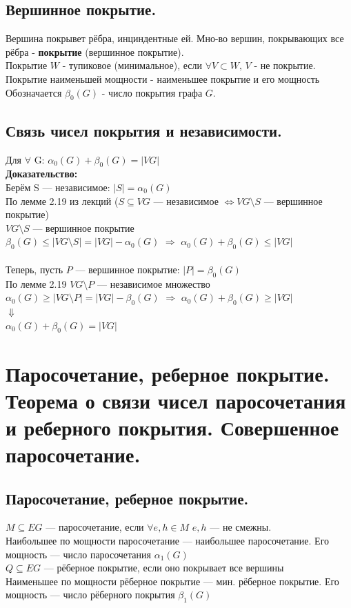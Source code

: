 \documentclass[12pt]{article}
\begin{document}
\subsection{Вершинное покрытие.}
	Вершина покрывет рёбра, инциндентные ей. Мно-во вершин, покрывающих все рёбра - \textbf{покрытие} (вершинное покрытие).\\
	Покрытие $W$ - тупиковое (минимальное), если $\forall V \subset W, \, V$ - не покрытие. Покрытие наименьшей мощности - наименьшее покрытие и его мощность
	Обозначается $\beta_0(G)$ - число покрытия графа $G$.
\subsection{Связь чисел покрытия и независимости.}
	Для $\forall$ G: $\alpha_0(G)+\beta_0(G)=|VG|$\\
\textbf{Доказательство:}\\
	Берём S — независимое: $|S| = \alpha_0(G)$\\
	По лемме 2.19 из лекций ($S \subseteq VG$ — независимое $\Leftrightarrow VG \setminus S$ — вершинное покрытие)\\
	$VG\setminus S$ — вершинное покрытие\\
	$\beta_0(G) \leqslant |VG \setminus S| = |VG| - \alpha_0(G)$ $\Rightarrow$ $\alpha_0(G) + \beta_0(G) \leqslant |VG|$\\\\
	Теперь, пусть $P$ — вершинное покрытие: $|P| = \beta_0(G)$\\
	По лемме 2.19 $VG \setminus P$ — независимое множество\\
	$\alpha_0(G) \geqslant |VG \setminus P| = |VG| - \beta_0(G)$ $\Rightarrow$ $\alpha_0(G) + \beta_0(G) \geqslant |VG|$\\
	$\Downarrow$\\
	$\alpha_0(G) + \beta_0(G) = |VG|$\\
	\qedsymbol

\section{Паросочетание, реберное покрытие. Теорема о связи чисел паросочетания и реберного покрытия. Совершенное паросочетание.}
	\subsection{Паросочетание, реберное покрытие.}
		$M \subseteq EG$ — паросочетание, если $\forall e,h \in M$ $e,h$ — не смежны.\\
		Наибольшее по мощности паросочетание — наибольшее паросочетание. Его мощность — число паросочетания $\alpha_1(G)$\\
		$Q \subseteq EG$ — рёберное покрытие, если оно покрывает все вершины\\
		Наименьшее по мощности рёберное покрытие — мин. рёберное покрытие. Его мощность — число рёберного покрытия $\beta_1(G)$
\end{document}
